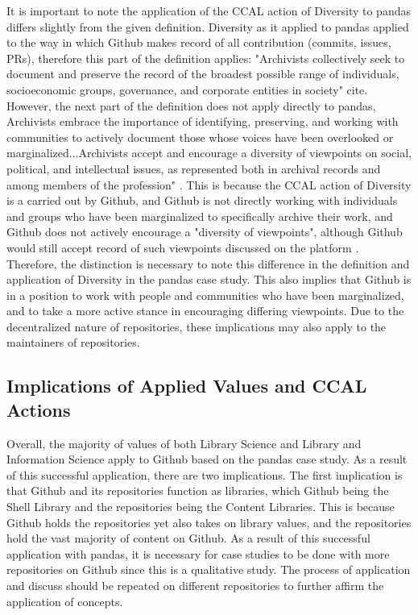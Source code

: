 It is important to note the application of the CCAL action of Diversity to pandas differs slightly from the given definition. Diversity as it applied to pandas applied to the way in which Github makes record of all contribution (commits, issues, PRs), therefore this part of the definition applies: "Archivists collectively seek to document and preserve the record of the broadest possible range of individuals, socioeconomic groups, governance, and corporate entities in society" cite\cite{rubin2016foundationslis}. However, the next part of the definition does not apply directly to pandas, Archivists embrace the importance of identifying, preserving, and working with communities to actively document those whose voices have been overlooked or marginalized...Archivists accept and encourage a diversity of viewpoints on social, political, and intellectual issues, as represented both in archival records and among members of the profession" \cite{rubin2016foundationslis}. This is because the CCAL action of Diversity is a carried out by Github, and Github is not directly working with individuals and groups who have been marginalized to specifically archive their work, and Github does not actively encourage a "diversity of viewpoints", although Github would still accept record of such viewpoints discussed on the platform \cite{rubin2016foundationslis}. Therefore, the distinction is necessary to note this difference in the definition and application of Diversity in the pandas case study. This also implies that Github is in a position to work with people and communities who have been marginalized, and to take a more active stance in encouraging differing viewpoints. Due to the decentralized nature of repositories, these implications may also apply to the maintainers of repositories.

\subsection{Implications of Applied Values and CCAL Actions}

Overall, the majority of values of both Library Science and Library and Information Science apply to Github based on the pandas case study. As a result of this successful application, there are two implications. The first implication is that Github and its repositories function as libraries, which Github being the Shell Library and the repositories being the Content Libraries. This is because Github holds the repositories yet also takes on library values, and the repositories hold the vast majority of content on Github. As a result of this successful application with pandas, it is necessary for case studies to be done with more repositories on Github since this is a qualitative study. The process of application and discuss should be repeated on different repositories to further affirm the application of concepts. 

